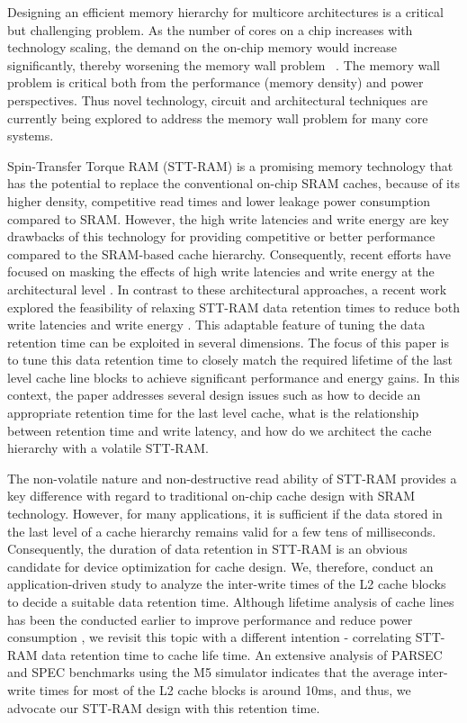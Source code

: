 
Designing an efficient memory hierarchy for multicore architectures is a critical but challenging
problem. As the number of cores on a chip increases with technology scaling, the demand on the
on-chip memory would increase significantly, thereby worsening the memory wall problem
~\cite{BurgerGK96}. The memory wall problem is critical both from the performance (memory density)
and power perspectives. Thus novel technology, circuit and architectural techniques are currently
being explored to address the memory wall problem for many core systems.

Spin-Transfer Torque RAM (STT-RAM) is a promising memory technology that has the potential to replace the conventional on-chip SRAM
caches,  because of its higher density, competitive read times and lower leakage power consumption
compared to SRAM. However, the high write latencies and write energy are key drawbacks of this
technology for providing competitive or better performance compared to the SRAM-based cache
hierarchy. Consequently, recent efforts have focused on masking the effects of high write latencies
and write energy at the architectural level \cite{}. In contrast to these architectural approaches, a
recent  work explored the feasibility of relaxing STT-RAM data retention times to reduce both write
latencies and write energy \cite{}. This adaptable feature of tuning the data retention time can be
exploited in several dimensions. The focus of this paper is  to tune this data retention time to
closely match the required lifetime of the last level cache line blocks to achieve significant
performance and energy gains. In this context, the paper addresses several design issues such as how
to decide an appropriate retention time for the last level cache, what is the relationship between
retention time and write latency, and how do we architect the cache hierarchy with a volatile
STT-RAM.

The non-volatile nature and non-destructive read ability of  STT-RAM provides a key difference with
regard to traditional on-chip cache design with SRAM technology. However, for many applications, it
is sufficient if the data stored in the last level of a cache hierarchy remains valid for a few tens
of milliseconds. Consequently, the duration of data retention in STT-RAM is an obvious candidate for
device optimization for cache design. We, therefore, conduct an application-driven study to analyze
the inter-write times of the L2 cache blocks to decide a suitable data retention time. Although
lifetime analysis of cache lines has been the conducted earlier to improve performance and reduce
power consumption \cite{}, we revisit this topic with a different intention - correlating STT-RAM
data retention time to cache life time. An extensive analysis of PARSEC and SPEC benchmarks using the
M5 simulator \cite{} indicates that the average inter-write times for most of the L2 cache blocks is
around 10ms, and thus, we advocate our STT-RAM design with this retention time.

